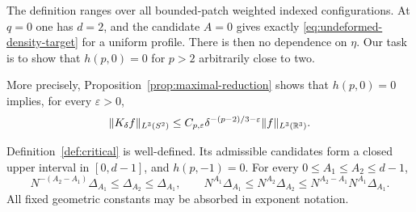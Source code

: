 The definition ranges over all bounded-patch weighted indexed
configurations. At $q=0$ one has $d=2$, and the candidate $A=0$ gives
exactly \eqref{eq:undeformed-density-target} for a uniform profile.
There is then no dependence on $\eta$. Our task is to show that
$h(p,0)=0$ for $p>2$ arbitrarily close to two.

More precisely, Proposition~\ref{prop:maximal-reduction} shows that
$h(p,0)=0$ implies, for every $\varepsilon>0$,
\[
 \|K_\delta f\|_{L^3(S^2)}
 \le C_{p,\varepsilon}\delta^{-(p-2)/3-\varepsilon}
          \|f\|_{L^3(\mathbb R^3)}.
\]

\begin{lemma}
\label{lem:critical-existence}
Definition~\ref{def:critical} is well-defined.  Its admissible candidates
form a closed upper interval in $[0,d-1]$, and $h(p,-1)=0$.  For
every $0\le A_1\le A_2\le d-1$,
\begin{equation}\label{eq:plank-exponent-Lipschitz}
 N^{-(A_2-A_1)}\Delta_{A_1}
 \le\Delta_{A_2}\le\Delta_{A_1},
 \qquad
 N^{A_1}\Delta_{A_1}\le N^{A_2}\Delta_{A_2}
 \le N^{A_2-A_1}N^{A_1}\Delta_{A_1}.
\end{equation}
All fixed geometric constants may be absorbed in exponent notation.
\end{lemma}

